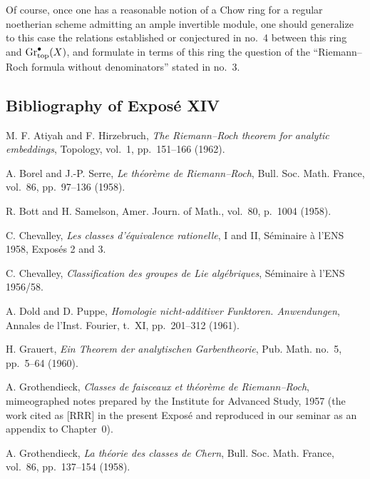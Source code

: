 Of course, once one has a reasonable notion of a Chow ring for a regular
noetherian scheme admitting an ample invertible module, one should
generalize to this case the relations established or conjectured in no.~4
between this ring and $\operatorname{Gr}_{\mathrm{top}}^\bullet(X)$, and formulate in terms of this ring
the question of the ``Riemann--Roch formula without denominators'' stated in
no.~3.

\subsection*{Bibliography of Expos\'e XIV}

\begin{enumerate}[label={[\arabic*]},leftmargin=3.2em]
\item M. F. Atiyah and F. Hirzebruch,
  \emph{The Riemann--Roch theorem for analytic embeddings},
  Topology, vol.~1, pp.~151--166 (1962).

\item A. Borel and J.-P. Serre,
  \emph{Le th\'eor\`eme de Riemann--Roch},
  Bull. Soc. Math. France, vol.~86, pp.~97--136 (1958).

\item R. Bott and H. Samelson,
  Amer. Journ. of Math., vol.~80, p.~1004 (1958).

\item C. Chevalley,
  \emph{Les classes d'\'equivalence rationelle}, I and II,
  S\'eminaire \`a l'ENS 1958, Expos\'es 2 and 3.

\item C. Chevalley,
  \emph{Classification des groupes de Lie alg\'ebriques},
  S\'eminaire \`a l'ENS 1956/58.

\item A. Dold and D. Puppe,
  \emph{Homologie nicht-additiver Funktoren. Anwendungen},
  Annales de l'Inst. Fourier, t.~XI, pp.~201--312 (1961).

\item H. Grauert,
  \emph{Ein Theorem der analytischen Garbentheorie},
  Pub. Math. no.~5, pp.~5--64 (1960).

\item A. Grothendieck,
  \emph{Classes de faisceaux et th\'eor\`eme de Riemann--Roch},
  mimeographed notes prepared by the Institute for Advanced Study, 1957
  (the work cited as [RRR] in the present Expos\'e and reproduced in our
  seminar as an appendix to Chapter~0).

\item A. Grothendieck,
  \emph{La th\'eorie des classes de Chern},
  Bull. Soc. Math. France, vol.~86, pp.~137--154 (1958).


\end{enumerate}
